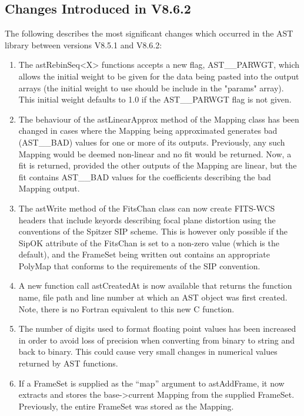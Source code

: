 \documentclass[twoside,11pt]{starlink}
\begin{document}
\subsection{Changes Introduced in V8.6.2}
The following describes the most significant changes which
occurred in the AST library between versions V8.5.1 and V8.6.2:

\begin{enumerate}

\item The astRebinSeq<X> functions accepts a new flag, AST\_\_PARWGT, which
allows the initial weight to be given for the data being pasted into the
output arrays (the initial weight to use should be include in the "params"
array). This initial weight defaults to 1.0 if the AST\_\_PARWGT flag is not
given.

\item The behaviour of the astLinearApprox method of the Mapping class has
been changed in cases where the Mapping being approximated generates bad
(AST\_\_BAD) values for one or more of its outputs. Previously, any such
Mapping would be deemed non-linear and no fit would be returned. Now, a
fit is returned, provided the other outputs of the Mapping are linear,
but the fit contains AST\_\_BAD values for the coefficients describing the
bad Mapping output.

\item The astWrite method of the FitsChan class can now create FITS-WCS headers
that include keyords describing focal plane distortion using the
conventions of the Spitzer SIP scheme. This is however only possible if
the SipOK attribute of the FitsChan is set to a non-zero value (which is
the default), and the FrameSet being written out contains an appropriate
PolyMap that conforms to the requirements of the SIP convention.

\item A new function call astCreatedAt is now available that returns the
function name, file path and line number at which an AST object was first
created. Note, there is no Fortran equivalent to this new C function.

\item The number of digits used to format floating point values has been
increased in order to avoid loss of precision when converting from binary
to string and back to binary. This could cause very small changes in numerical
values returned by AST functions.

\item If a FrameSet is supplied as the ``map'' argument to astAddFrame, it now
extracts and stores the base->current Mapping from the supplied FrameSet.
Previously, the entire FrameSet was stored as the Mapping.

\end{enumerate}
\end{document}

